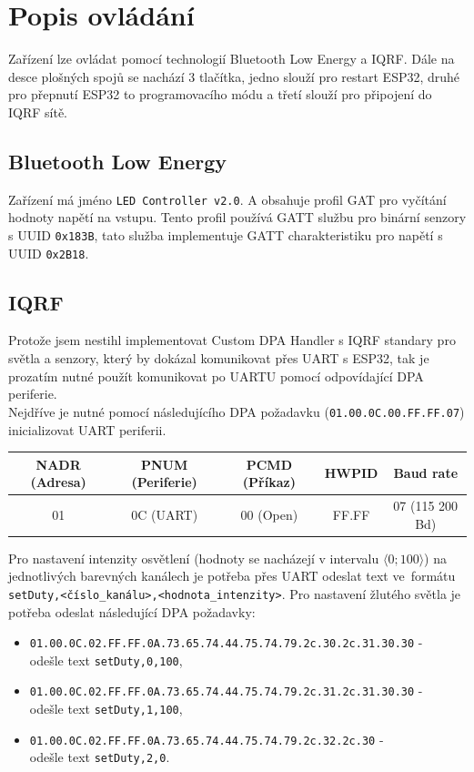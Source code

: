 \documentclass[12pt]{article}
\begin{document}
	\section{Popis ovládání}
	
	Zařízení lze ovládat pomocí technologií Bluetooth Low Energy a IQRF. Dále na desce plošných spojů se nachází 3 tlačítka, jedno slouží pro restart ESP32, druhé pro přepnutí ESP32 to programovacího módu a třetí slouží pro připojení do IQRF sítě.
	
	\subsection{Bluetooth Low Energy}
	
	Zařízení má jméno \texttt{LED Controller v2.0}. A obsahuje profil GAT pro vyčítání hodnoty napětí na vstupu. Tento profil používá GATT službu pro binární senzory s UUID \texttt{0x183B}, tato služba implementuje GATT charakteristiku pro napětí s UUID \texttt{0x2B18}.
	
	\subsection{IQRF}
	
	Protože jsem nestihl implementovat Custom DPA Handler s IQRF standary pro světla a senzory, který by dokázal komunikovat přes UART s ESP32, tak je prozatím nutné použít komunikovat po UARTU pomocí odpovídající DPA periferie. \\
	Nejdříve je nutné pomocí následujícího DPA požadavku (\texttt{01.00.0C.00.FF.FF.07}) inicializovat UART periferii.
	
	\begin{table}[h]
	\centering
	\begin{tabular}{|c|c|c|c|c|}
	\hline 
	\textbf{NADR (Adresa)} & \textbf{PNUM (Periferie)} & \textbf{PCMD (Příkaz)} & \textbf{HWPID} & \textbf{Baud rate} \\ 
	\hline 
	01 & 0C (UART) & 00 (Open) & FF.FF & 07 (115 200 Bd) \\ 
	\hline 
	\end{tabular}
	\end{table} 
	
	Pro nastavení intenzity osvětlení (hodnoty se nacházejí v intervalu  $\langle 0; 100 \rangle$) na jednotlivých barevných kanálech je potřeba přes UART odeslat text ve~formátu\\ \texttt{setDuty,<číslo\_kanálu>,<hodnota\_intenzity>}. Pro nastavení žlutého světla je potřeba odeslat následující DPA požadavky:
	\begin{itemize}
		\item \texttt{01.00.0C.02.FF.FF.0A.73.65.74.44.75.74.79.2c.30.2c.31.30.30} - \\odešle text \texttt{setDuty,0,100},
		\item \texttt{01.00.0C.02.FF.FF.0A.73.65.74.44.75.74.79.2c.31.2c.31.30.30} - \\odešle text \texttt{setDuty,1,100},
		\item \texttt{01.00.0C.02.FF.FF.0A.73.65.74.44.75.74.79.2c.32.2c.30} - \\odešle text \texttt{setDuty,2,0}.		
	\end{itemize}
	
\end{document}
